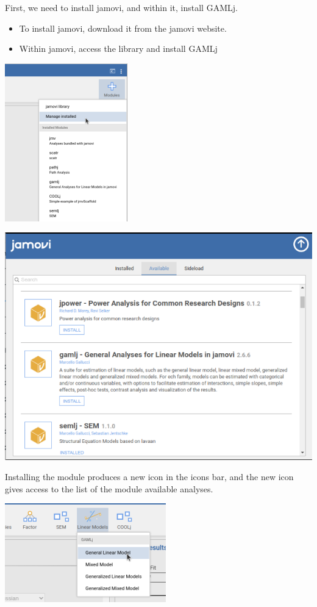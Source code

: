 \documentclass[
]{book}
\begin{document}
First, we need to install {jamovi}, and within it, install {GAMLj}.

\begin{itemize}
\item
  To install {jamovi}, download it from the jamovi website.
\item
  Within {jamovi}, access the library and install {GAMLj}
\end{itemize}

\begin{center}\includegraphics[width=0.4\linewidth]{bookletpics/0_library1} \end{center}

\begin{center}\includegraphics[width=0.7\linewidth]{bookletpics/0_library2} \end{center}

Installing the module produces a new icon in the icons bar, and the new icon gives access to the list of the module available analyses.

\includegraphics[width=0.5\linewidth]{bookletpics/0_menu1}
\end{document}
